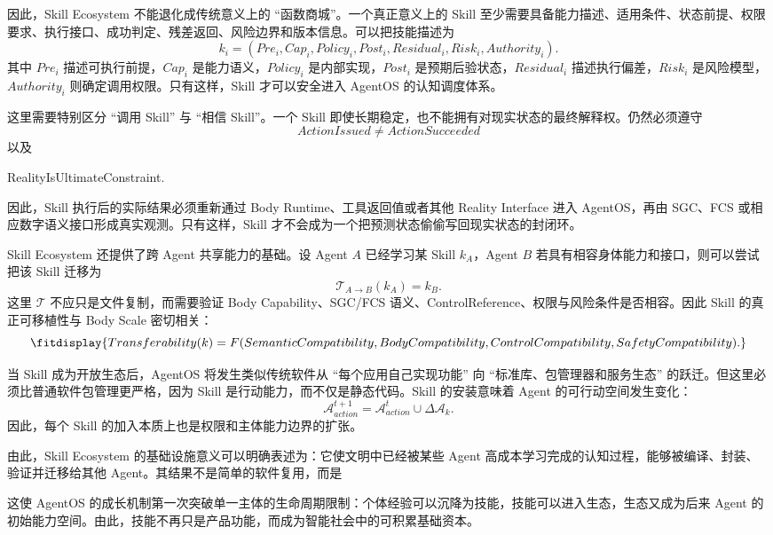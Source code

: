 因此，Skill Ecosystem 不能退化成传统意义上的 ``函数商城''。一个真正意义上的 Skill 至少需要具备能力描述、适用条件、状态前提、权限要求、执行接口、成功判定、残差返回、风险边界和版本信息。可以把技能描述为
\[
k_i
=
(
Pre_i,
Cap_i,
Policy_i,
Post_i,
Residual_i,
Risk_i,
Authority_i
).
\]
其中 $Pre_i$ 描述可执行前提，$Cap_i$ 是能力语义，$Policy_i$ 是内部实现，$Post_i$ 是预期后验状态，$Residual_i$ 描述执行偏差，$Risk_i$ 是风险模型，$Authority_i$ 则确定调用权限。只有这样，Skill 才可以安全进入 AgentOS 的认知调度体系。

这里需要特别区分 ``调用 Skill'' 与 ``相信 Skill''。一个 Skill 即使长期稳定，也不能拥有对现实状态的最终解释权。仍然必须遵守
\[
\boxed{
ActionIssued\neq ActionSucceeded
}
\]
以及
\begin{statementbox}
RealityIsUltimateConstraint.
\end{statementbox}
因此，Skill 执行后的实际结果必须重新通过 Body Runtime、工具返回值或者其他 Reality Interface 进入 AgentOS，再由 SGC、FCS 或相应数字语义接口形成真实观测。只有这样，Skill 才不会成为一个把预测状态偷偷写回现实状态的封闭环。

Skill Ecosystem 还提供了跨 Agent 共享能力的基础。设 Agent $A$ 已经学习某 Skill $k_A$，Agent $B$ 若具有相容身体能力和接口，则可以尝试把该 Skill 迁移为
\[
\mathcal T_{A\rightarrow B}(k_A)
=
k_B.
\]
这里 $\mathcal T$ 不应只是文件复制，而需要验证 Body Capability、SGC/FCS 语义、ControlReference、权限与风险条件是否相容。因此 Skill 的真正可移植性与 Body Scale 密切相关：
\[
\fitdisplay{
Transferability(k)
=
F(
SemanticCompatibility,
BodyCompatibility,
ControlCompatibility,
SafetyCompatibility
).
}
\]

当 Skill 成为开放生态后，AgentOS 将发生类似传统软件从 ``每个应用自己实现功能'' 向 ``标准库、包管理器和服务生态'' 的跃迁。但这里必须比普通软件包管理更严格，因为 Skill 是行动能力，而不仅是静态代码。Skill 的安装意味着 Agent 的可行动空间发生变化：
\[
\mathcal A_{action}^{t+1}
=
\mathcal A_{action}^{t}
\cup
\Delta \mathcal A_k.
\]
因此，每个 Skill 的加入本质上也是权限和主体能力边界的扩张。

由此，Skill Ecosystem 的基础设施意义可以明确表述为：它使文明中已经被某些 Agent 高成本学习完成的认知过程，能够被编译、封装、验证并迁移给其他 Agent。其结果不是简单的软件复用，而是
\begin{statementbox}
\centering
{}
\end{statementbox}
这使 AgentOS 的成长机制第一次突破单一主体的生命周期限制：个体经验可以沉降为技能，技能可以进入生态，生态又成为后来 Agent 的初始能力空间。由此，技能不再只是产品功能，而成为智能社会中的可积累基础资本。

